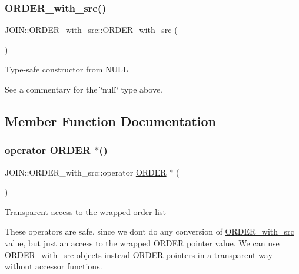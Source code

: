 \subsubsection{\texorpdfstring{O\+R\+D\+E\+R\+\_\+with\+\_\+src()}{ORDER\_with\_src()}}
{\footnotesize\ttfamily J\+O\+I\+N\+::\+O\+R\+D\+E\+R\+\_\+with\+\_\+src\+::\+O\+R\+D\+E\+R\+\_\+with\+\_\+src (\begin{DoxyParamCaption}\item[{null $\ast$}]{ }\end{DoxyParamCaption})\hspace{0.3cm}{\ttfamily [inline]}}

Type-\/safe constructor from N\+U\+LL

See a commentary for the \char`\"{}null\char`\"{} type above. 

\subsection{Member Function Documentation}
\mbox{\label{classJOIN_1_1ORDER__with__src_a2d64ba9d78fc1497d0c814f3d1a78a05}} 
\subsubsection{\texorpdfstring{operator O\+R\+D\+E\+R $\ast$()}{operator ORDER *()}}
{\footnotesize\ttfamily J\+O\+I\+N\+::\+O\+R\+D\+E\+R\+\_\+with\+\_\+src\+::operator \mbox{\hyperlink{structst__order}{O\+R\+D\+ER}} $\ast$ (\begin{DoxyParamCaption}{ }\end{DoxyParamCaption})\hspace{0.3cm}{\ttfamily [inline]}}

Transparent access to the wrapped order list

These operators are safe, since we don\textquotesingle{}t do any conversion of \mbox{\hyperlink{classJOIN_1_1ORDER__with__src}{O\+R\+D\+E\+R\+\_\+with\+\_\+src}} value, but just an access to the wrapped O\+R\+D\+ER pointer value. We can use \mbox{\hyperlink{classJOIN_1_1ORDER__with__src}{O\+R\+D\+E\+R\+\_\+with\+\_\+src}} objects instead O\+R\+D\+ER pointers in a transparent way without accessor functions.

